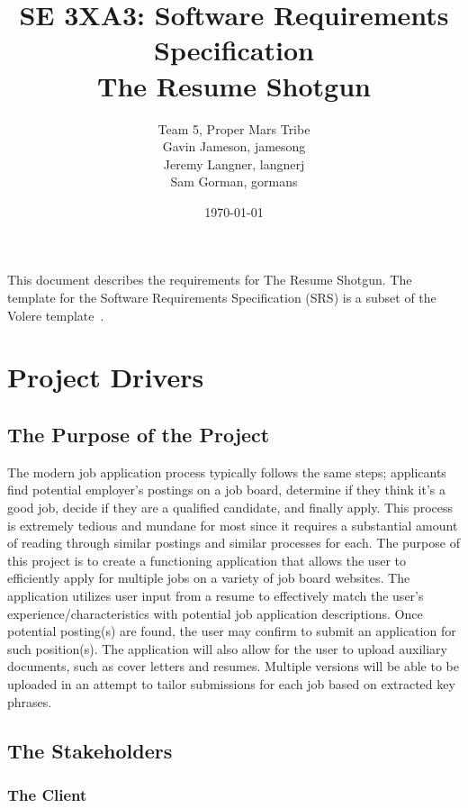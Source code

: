 \documentclass[12pt, titlepage]{article}
\title{SE 3XA3: Software Requirements Specification\\The Resume Shotgun}
\author{Team 5, Proper Mars Tribe
		\\ Gavin Jameson, jamesong
		\\ Jeremy Langner, langnerj
		\\ Sam Gorman, gormans
}
\date{\today}
\begin{document}
\maketitle

\tableofcontents
\listoftables
\listoffigures

\newpage


This document describes the requirements for The Resume Shotgun. The template for the Software Requirements Specification (SRS) is a subset of the Volere template~\citep{RobertsonAndRobertson2012}. %

\section{Project Drivers}

\subsection{The Purpose of the Project}
The modern job application process typically follows the same steps; applicants find potential employer's postings on a job board, determine if they think it's a good job, decide if they are a qualified candidate, and finally apply. This process is extremely tedious and mundane for most since it requires a substantial amount of reading through similar postings and similar processes for each.
The purpose of this project is to create a functioning application that allows the user to efficiently apply for multiple jobs on a variety of job board websites. The application utilizes user input from a resume to effectively match the user's experience/characteristics with potential job application descriptions. Once potential posting(s) are found, the user may confirm to submit an application for such position(s). The application will also allow for the user to upload auxiliary documents, such as cover letters and resumes. Multiple versions will be able to be uploaded in an attempt to tailor submissions for each job based on extracted key phrases. 

\subsection{The Stakeholders}

\subsubsection{The Client}
\end{document}
